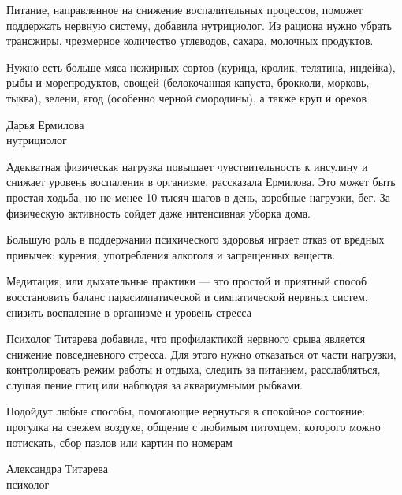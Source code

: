Питание, направленное на снижение воспалительных процессов, поможет поддержать нервную систему, добавила нутрициолог. Из рациона нужно убрать трансжиры, чрезмерное количество углеводов, сахара, молочных продуктов.

\begin{fancyquotes}
    Нужно есть больше мяса нежирных сортов (курица, кролик, телятина, индейка), рыбы и морепродуктов, овощей (белокочанная капуста, брокколи, морковь, тыква), зелени, ягод (особенно черной смородины), а также круп и орехов\\

    \begin{flushright}
        Дарья Ермилова\\
        нутрициолог
    \end{flushright}
\end{fancyquotes}

Адекватная физическая нагрузка повышает чувствительность к инсулину и снижает уровень воспаления в организме, рассказала Ермилова. Это может быть простая ходьба, но не менее 10 тысяч шагов в день, аэробные нагрузки, бег. За физическую активность сойдет даже интенсивная уборка дома.

Большую роль в поддержании психического здоровья играет отказ от вредных привычек: курения, употребления алкоголя и запрещенных веществ.

\begin{framed}
    \begin{center}
        \Large

        Медитация, или дыхательные практики — это простой и приятный способ восстановить баланс парасимпатической и симпатической нервных систем, снизить воспаление в организме и уровень стресса
    \end{center}
\end{framed}

Психолог Титарева добавила, что профилактикой нервного срыва является снижение повседневного стресса. Для этого нужно отказаться от части нагрузки, контролировать режим работы и отдыха, следить за питанием, расслабляться, слушая пение птиц или наблюдая за аквариумными рыбками.

\begin{fancyquotes}
    Подойдут любые способы, помогающие вернуться в спокойное состояние: прогулка на свежем воздухе, общение с любимым питомцем, которого можно потискать, сбор пазлов или картин по номерам\\

    \begin{flushright}
        Александра Титарева\\
        психолог
    \end{flushright}

\end{fancyquotes}

